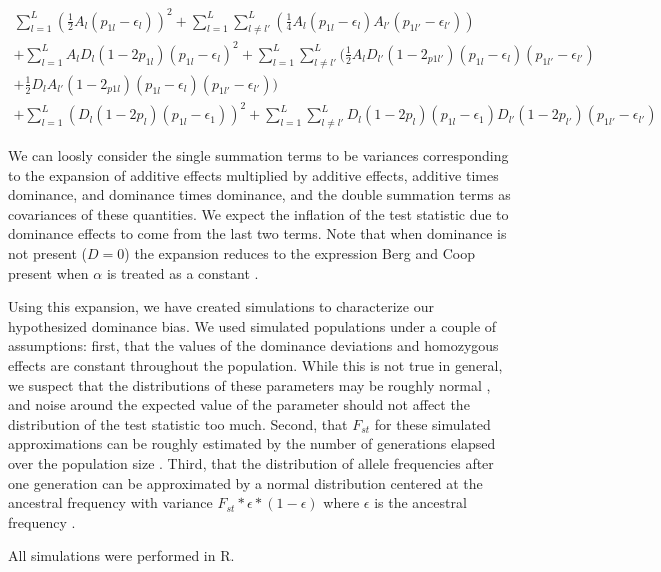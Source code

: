\documentclass[a4paper,12pt]{article}
\begin{document}
\begin{equation}
  \begin{split}
  \sum^L_{l=1}( \frac{1}{2}A_l(p_{1l}-\epsilon_l))^2+\sum^L_{l=1}\sum^L_{
    l \neq l'}(\frac{1}{4}A_l(p_{1l}-\epsilon_{l})A_{l'}(p_{1l'}-\epsilon_{l'}))
  \\
  +\sum^L_{l=1}A_lD_l(1-2p_{1l})(p_{1l}-\epsilon_l)^2 +
  \sum^L_{l=1}\sum^L_{l \neq
    l'}(\frac{1}{2}A_lD_{l'}(1-2_{p1l'})(p_{1l}-\epsilon_l)(p_{1l'}-\epsilon_{l'}) \\
  + \frac{1}{2}D_lA_{l'}(1-2_{p1l})(p_{1l}-\epsilon_l)(p_{1l'}-\epsilon_{l'})) \\
   + \sum^L_{l=1} (D_l(1-2p_l)(p_{1l}-\epsilon_{1}))^2
   + \sum^L_{l=1}\sum^L_{l \neq
     l'}D_{l}(1-2p_{l})(p_{1l}-\epsilon_{1})D_{l'}(1-2p_{l'})(p_{1l'}-\epsilon_{l'}) \label{expansion}
  \end{split}
\end{equation}

We can loosly consider the single summation terms to be variances
corresponding to the expansion of additive effects multiplied by
additive effects, additive times dominance, and dominance times
dominance, and the double summation terms as covariances of these
quantities. We expect the inflation of the test statistic due to
dominance effects to come from the last two terms. Note that when
dominance is not present ($D=0$) the expansion reduces to the
expression Berg and Coop present when $\alpha$ is treated as a constant
\cite{berg}.

Using this expansion, we have created simulations to characterize our
hypothesized dominance bias. We used simulated populations
under a couple of assumptions: first, that the values of the dominance
deviations and homozygous effects are constant throughout the
population. While this is not true in general, we suspect that the
distributions of these parameters may be roughly normal
\cite{normaldist}, and noise around the expected value of the
parameter should not affect the distribution of the test statistic too
much. Second, that $F_{st}$ for these simulated approximations
can be roughly estimated by the number of generations elapsed over the
population size \cite{Fstest}. Third, that the distribution of allele frequencies after
one generation can be approximated by a normal distribution centered
at the ancestral frequency with variance
$F_{st}*\epsilon*(1-\epsilon)$ where $\epsilon$ is the ancestral
frequency \cite{gillespie}.

All simulations were performed in R. 
\end{document}
